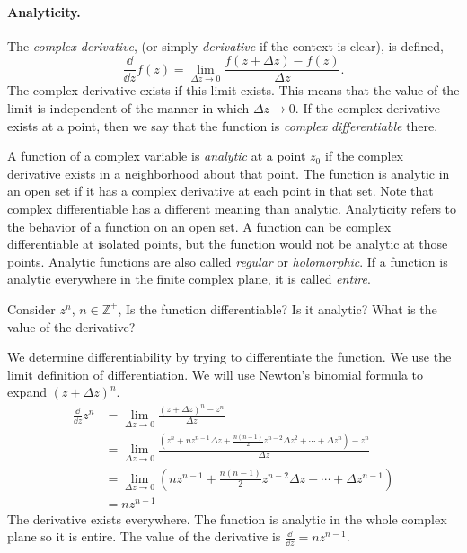 \paragraph{Analyticity.}
The \textit{complex derivative}, (or simply \textit{derivative} 
if the context is clear), is defined, 
\[ 
\frac{\dd}{\dd z} f(z) = \lim_{\Delta z \to 0}\frac{f(z + \Delta z) - f(z)}{\Delta z}.
\]
The complex derivative exists if this limit exists.  This means that the 
value of the limit is independent of the manner in which $\Delta z \to 0$.  
If the complex derivative exists at a point, then we say that the function
is \textit{complex differentiable} there.

A function of a complex variable is \textit{analytic} 
at a point $z_0$ if the complex derivative exists in a neighborhood
about that point. The function is analytic in an open set if it has a 
complex derivative at each point in that set.  
Note that complex differentiable has a different meaning than analytic.
Analyticity refers to the behavior of a function on an open set.  A function
can be complex differentiable at isolated points, but the function would
not be analytic at those points.
Analytic functions are also called \textit{regular} or \textit{holomorphic}.
If a function is analytic everywhere in the finite complex plane, it is 
called \textit{entire}.



\begin{Example}
  \label{example ddz zn}
  Consider $z^n$, $n \in \mathbb{Z}^+$, Is the function differentiable?  
  Is it analytic? What is the value of the derivative?

  We determine differentiability by trying to differentiate the function.
  We use the limit definition of differentiation.  We will use Newton's 
  binomial formula to expand $(z + \Delta z)^n$.
  \begin{align*}
    \frac{\dd}{\dd z} z^n
    &= \lim_{\Delta z \to 0} \frac{ (z + \Delta z)^n - z^n }{ \Delta z } 
    \\
    &= \lim_{\Delta z \to 0} \frac{ \left( z^n + n z^{n-1} \Delta z
        + \frac{n (n-1)}{2} z^{n-2} \Delta z^2 + \cdots + \Delta z^n
      \right) - z^n }{ \Delta z } 
    \\
    &= \lim_{\Delta z \to 0} \left( n z^{n-1}
      + \frac{n (n-1)}{2} z^{n-2} \Delta z + \cdots + \Delta z^{n-1} \right) 
    \\
    &= n z^{n-1}
  \end{align*}
  The derivative exists everywhere.  The function is analytic in the whole
  complex plane so it is entire.  The value of the derivative is 
  $\frac{\dd}{\dd z} = n z^{n-1}$.
\end{Example}








